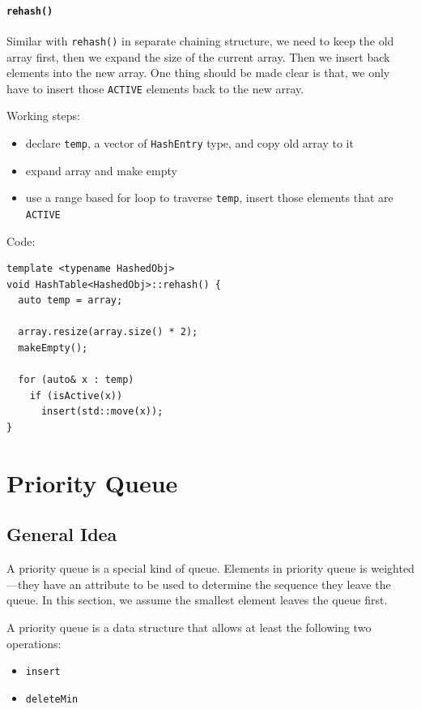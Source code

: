 \documentclass[12pt]{book}
\begin{document}
\subsubsection{\texttt{rehash()}}
\label{sec:org2380cfd}
Similar with \texttt{rehash()} in separate chaining structure, we need to keep the old array first, then we expand the size of the current array. Then we insert back elements into the new array. One thing should be made clear is that, we only have to insert those \texttt{ACTIVE} elements back to the new array.

Working steps:
\begin{itemize}
\item declare \texttt{temp}, a vector of \texttt{HashEntry} type, and copy old array to it
\item expand array and make empty
\item use a range based for loop to traverse \texttt{temp}, insert those elements that are \texttt{ACTIVE}
\end{itemize}

Code:
\begin{verbatim}
template <typename HashedObj>
void HashTable<HashedObj>::rehash() {
  auto temp = array;

  array.resize(array.size() * 2);
  makeEmpty();

  for (auto& x : temp)
    if (isActive(x))
      insert(std::move(x));
}
\end{verbatim}

\chapter{Priority Queue}
\label{sec:orgf679c59}
\section{General Idea}
\label{sec:org01b1011}
A priority queue is a special kind of queue. Elements in priority queue is weighted---they have an attribute to be used to determine the sequence they leave the queue. In this section, we assume the smallest element leaves the queue first.

A priority queue is a data structure that allows at least the following two operations:
\begin{itemize}
\item \texttt{insert}
\item \texttt{deleteMin}
\end{itemize}
\end{document}
